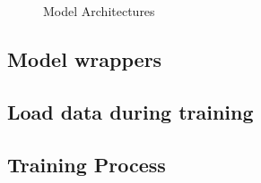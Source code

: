 \documentclass[12pt]{article}
\begin{document}
\begin{figure}[h]
{        \label{fig:b}%
        }%
    \caption{Model Architectures}
\end{figure}




\subsection{Model wrappers}

\subsection{Load data during training}

\subsection{Training Process}
\end{document}
